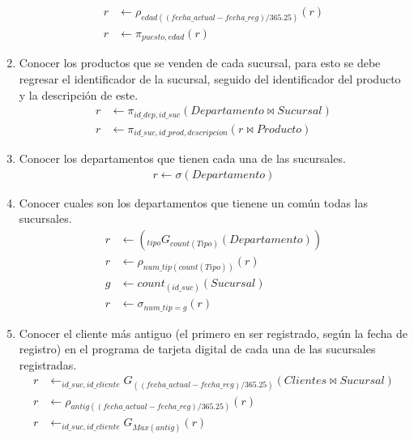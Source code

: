 \documentclass{article}
\begin{document}
\begin{enumerate}
{\begin{align*}
                r &\leftarrow \rho_{edad((fecha\_actual-fecha\_reg)/365.25)}(r) \\
                r &\leftarrow \pi_{puesto, edad}(r)
            \end{align*}
        }
        \item {
            Conocer los productos que se venden de cada sucursal, para esto se 
            debe regresar el identificador de la sucursal, seguido del
            identificador del producto y la descripción de este.
            \begin{align*}
                r &\leftarrow \pi_{id\_dep, id\_suc}(Departamento \bowtie Sucursal)\\
                r &\leftarrow \pi_{id\_suc, id\_prod, descripcion}(r \bowtie Producto)
            \end{align*}
        }
        \item {
            Conocer los departamentos que tienen cada una de las sucursales.
            \begin{align*}
                r \leftarrow \sigma(Departamento)
            \end{align*}
        }
        \item {
            Conocer cuales son los departamentos que tienene un común todas las 
            sucursales.
            \begin{align*}
                r &\leftarrow (_{tipo}G_{count(Tipo)}(Departamento)) \\
                r &\leftarrow \rho_{num\_tip(count(Tipo))}(r) \\
                g &\leftarrow count_{(id\_suc)}(Sucursal) \\
                r &\leftarrow \sigma_{num\_tip = g}(r)
            \end{align*}
        }
        \item {
            Conocer el cliente más antiguo (el primero en ser registrado, según
            la fecha de registro) en el programa de tarjeta digital de cada una
            de las sucursales registradas.
            \begin{align*}
            r &\leftarrow _{id\_suc,id\_cliente}G_{((fecha\_actual-fecha\_reg)/365.25)}(Clientes \bowtie Sucursal)\\
            r &\leftarrow \rho_{antig((fecha\_actual-fecha\_reg)/365.25)}(r)\\
            r &\leftarrow _{id\_suc,id\_cliente}G_{Max(antig)} (r) \\           

\end{align*}}
\end{enumerate}
\end{document}
